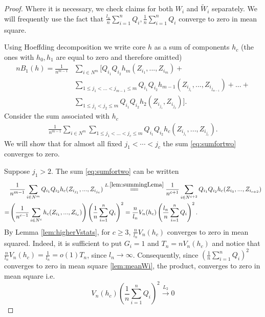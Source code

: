 \begin{proof}
Where  it is necessary, we check claims for both $W_i$ and  $\tilde W_i$ separately. We will frequently use the fact that 
$
 \frac{l_n}{n} \sum_{i=1}^{n}Q_i, \frac{1}{n} \sum_{i=1}^{n}Q_i
$
converge to zero in mean square.

Using Hoeffding decomposition we  write core  $h$ as a sum of components $h_c$ (the ones with $h_0,h_1$ are equal to zero and therefore omitted)
\begin{align*}
 n B_1(h) = \frac{1} {n^{m-1}}  &\sum_{i \in N^m}  \Big[ Q_{i_1} Q_{i_2}   h_m(Z_{i_1},...,Z_{i_m})  + \\ 
 &\sum_{1 \leq j_1 < ...<j_{m-1} \leq m } Q_{i_1} Q_{i_2} h_{m-1}(Z_{i_{j_1}},...,Z_{i_{j_{m-1}}})   + ... + \\
 &\sum_{1 \leq j_1 < j_2 \leq m } Q_{i_1} Q_{i_2} h_2(Z_{i_{j_1}},Z_{i_{j_2}}) \Big].
\end{align*}
Consider the sum associated with $h_c$
\begin{align}
\label{eq:sumfortwo}
\frac{1} {n^{m-1}}  \sum_{i \in N^m}  \sum_{1 \leq j_1 < ...<j_c \leq m } Q_{i_1} Q_{i_2} h_c(Z_{i_{j_1}},...,Z_{i_{j_c}}).
\end{align}
We will show that for almost all fixed  $j_1 < \cdots < j_c$ the sum \ref{eq:sumfortwo} converges to zero.

Suppose  $j_1 >2$. The sum \ref{eq:sumfortwo} can be written
\begin{align*}
&\frac{1} {n^{m-1}}  \sum_{i \in N^m}   Q_{i_1} Q_{i_2} h_c(Z_{i_{j_1}},...,Z_{i_{j_c}})	 \overset{L.\ref{lem:summingLema}}{=\joinrel=}  
\frac{1} {n^{c+1}}  \sum_{i \in N^{c+2}}   Q_{i_1} Q_{i_2} h_c(Z_{i_3},...,Z_{i_{c+2}})  \\
=& \left( \frac{1}{n^{c-1}}   \sum_{ i \in N^c} h_c(Z_{i_1},...,Z_{i_c}) \right) \left( \frac{1}{n} \sum_{i=1}^{n}Q_i \right)^2  = \frac{n}{l_n}V_n(h_c)  \left( \frac{l_n}{n} \sum_{i=1}^{n}Q_i \right)^2 .  
\end{align*}
By   Lemma \ref{lem:higherVstats}, for $c \geq 3$, $\frac{n}{l_n} V_n(h_{c})$  converges to zero in mean squared. Indeed, it is sufficient to put $G_i=1$ and $T_n = n V_n(h_{c})$ and notice that $\frac{n}{l_n} V_n(h_{c}) = \frac{1}{l_n} = o(1)T_n$, since $l_n \to \infty$. Consequently, since   $(\frac{1}{n} \sum_{i=1}^{n}Q_i)^2$ converges to zero in mean square  \ref{lem:meanWi}, the product, converges to zero in mean square i.e.
\[
 V_n(h_c)  \left( \frac{1}{n} \sum_{i=1}^{n}Q_i \right)^2  \overset{L_2}{\to} 0
\]



\end{proof}
